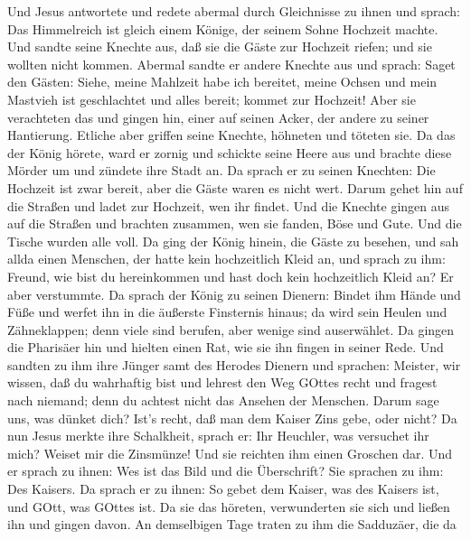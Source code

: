  Und Jesus antwortete und redete abermal durch Gleichnisse
zu ihnen und sprach:  Das Himmelreich ist gleich einem
Könige, der seinem Sohne Hochzeit machte.  Und sandte seine
Knechte aus, daß sie die Gäste zur Hochzeit riefen; und sie wollten
nicht kommen.  Abermal sandte er andere Knechte aus und
sprach: Saget den Gästen: Siehe, meine Mahlzeit habe ich bereitet, meine
Ochsen und mein Mastvieh ist geschlachtet und alles bereit; kommet zur
Hochzeit!  Aber sie verachteten das und gingen hin, einer
auf seinen Acker, der andere zu seiner Hantierung.  Etliche
aber griffen seine Knechte, höhneten und töteten sie.  Da
das der König hörete, ward er zornig und schickte seine Heere aus und
brachte diese Mörder um und zündete ihre Stadt an.  Da
sprach er zu seinen Knechten: Die Hochzeit ist zwar bereit, aber die
Gäste waren es nicht wert.  Darum gehet hin auf die Straßen
und ladet zur Hochzeit, wen ihr findet.  Und die Knechte
gingen aus auf die Straßen und brachten zusammen, wen sie fanden, Böse
und Gute. Und die Tische wurden alle voll.  Da ging der
König hinein, die Gäste zu besehen, und sah allda einen Menschen, der
hatte kein hochzeitlich Kleid an,  und sprach zu ihm:
Freund, wie bist du hereinkommen und hast doch kein hochzeitlich Kleid
an? Er aber verstummte.  Da sprach der König zu seinen
Dienern: Bindet ihm Hände und Füße und werfet ihn in die äußerste
Finsternis hinaus; da wird sein Heulen und Zähneklappen; 
denn viele sind berufen, aber wenige sind auserwählet.  Da
gingen die Pharisäer hin und hielten einen Rat, wie sie ihn fingen in
seiner Rede.  Und sandten zu ihm ihre Jünger samt des
Herodes Dienern und sprachen: Meister, wir wissen, daß du wahrhaftig
bist und lehrest den Weg GOttes recht und fragest nach niemand; denn du
achtest nicht das Ansehen der Menschen.  Darum sage uns,
was dünket dich? Ist's recht, daß man dem Kaiser Zins gebe, oder nicht?
 Da nun Jesus merkte ihre Schalkheit, sprach er: Ihr
Heuchler, was versuchet ihr mich?  Weiset mir die
Zinsmünze! Und sie reichten ihm einen Groschen dar.  Und er
sprach zu ihnen: Wes ist das Bild und die Überschrift?  Sie
sprachen zu ihm: Des Kaisers. Da sprach er zu ihnen: So gebet dem
Kaiser, was des Kaisers ist, und GOtt, was GOttes ist.  Da
sie das höreten, verwunderten sie sich und ließen ihn und gingen davon.
 An demselbigen Tage traten zu ihm die Sadduzäer, die da
